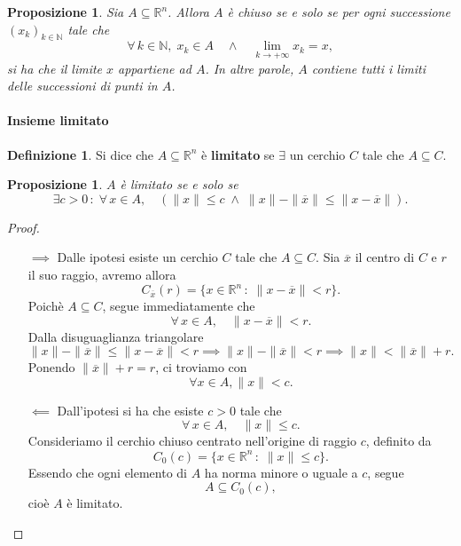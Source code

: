\documentclass{article}
\theoremstyle{plain}
\newtheorem{prop}[thm]{Proposizione}
\theoremstyle{definition}
\newtheorem{defn}{Definizione}[section]
\theoremstyle{remark}
\begin{document}
\vspace{10pt}

\begin{bxthm}
\begin{prop}
Sia $A\subseteq\mathbb{R}^n$. Allora $A$ è chiuso se e solo se per ogni successione $(x_k)_{k\in\mathbb{N}}$ tale che 
\[
    \forall\, k\in\mathbb{N},\;x_k\in A \quad \land\quad \lim_{k\to+\infty} x_k = x,
\]
si ha che il limite $x$ appartiene ad $A$. In altre parole, $A$ contiene tutti i limiti delle successioni di punti in $A$.
\end{prop}
\end{bxthm}

\vspace{10pt}

\paragraph{Insieme limitato}
\begin{bxthm}
\begin{defn}
    Si dice che $A\subseteq\mathbb{R}^n$ è \textbf{limitato} se $\exists$ un cerchio $C$ tale che $A\subseteq C$.    
\end{defn}
\end{bxthm}

\vspace{10pt}

\begin{bxthm}
\begin{prop}
    $A$ è limitato se e solo se 
    \[\exists c>0 \,:\;\forall\,x\in A,\quad(\|x\|\leq c\;\land\; \| x \|-\| \overline{x} \|\leq \| x-\overline{x} \|).\]
\end{prop}
\end{bxthm}
\begin{proof}\hfill 
    \begin{itemize}
        \item[$\implies$] Dalle ipotesi esiste un cerchio $C$ tale che $A\subseteq C$. Sia $\overline{x}$ il centro di $C$ e $r$ il suo raggio, avremo allora 
        \[C_{\overline{x}}(r)=\{x\in\mathbb{R}^n\,:\;\| x-\overline{x} \|<r\}.\]
        Poichè $A\subseteq C$, segue immediatamente che 
        \[\forall\, x\in A,\quad \| x-\overline{x} \|<r.\]
        Dalla disuguaglianza triangolare 
        \[\| x \| -\| \overline{x} \|\leq\| x-\overline{x} \|<r \implies \| x \|-\| \overline{x} \|<r \implies \| x \|<\| \overline{x} \|+r.\]
        Ponendo $\| \overline{x} \|+r=r$, ci troviamo con 
        \[\forall x\in A, \| x \| < c.\]

        \item[$\impliedby$] Dall'ipotesi si ha che esiste $c>0$ tale che
        \[
        \forall\, x\in A,\quad \|x\|\leq c.
        \]
        Consideriamo il cerchio chiuso centrato nell'origine di raggio $c$, definito da
        \[
        C_{0}(c)=\{x\in\mathbb{R}^n\,:\; \|x\|\leq c\}.
        \]
        Essendo che ogni elemento di $A$ ha norma minore o uguale a $c$, segue 
        \[
        A\subseteq C_{0}(c),
        \]
        cioè $A$ è limitato.
    \end{itemize}
\end{proof}
\end{document}
